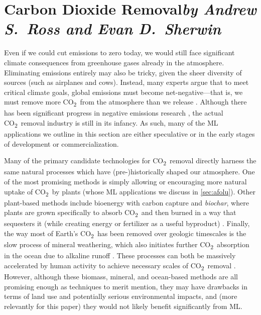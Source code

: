 \documentclass[11pt]{report}
\newcommand{\carbon}{\texorpdfstring{CO\textsubscript{2}}{CO2}}
\begin{document}
\section{Carbon Dioxide Removal\texorpdfstring{\hfill\textit{by Andrew S.~Ross and Evan D.~Sherwin}}{}}
\label{sec:ccs}
Even if we could cut emissions to zero today, we would still face significant climate consequences from greenhouse gases already in the atmosphere. 
Eliminating emissions entirely may also be tricky, given the sheer diversity of sources (such as airplanes and cows). Instead, many experts argue that to meet critical climate goals, global emissions must become net-negative---that is, we must remove more \carbon~from the atmosphere than we release \cite{fuss_betting_2014,gasser2015negative}. Although there has been significant progress in negative emissions research \cite{board2019negative,icef2018roadmap,minx2018negative,fuss2018negative,nemet2018negative}, the actual \carbon~removal industry is still in its infancy. As such, many of the ML applications we outline in this section are either speculative or in the early stages of development or commercialization.

Many of the primary candidate technologies for \carbon~removal directly harness the same natural processes which have (pre-)historically shaped our atmosphere.
One of the most promising methods is simply allowing or encouraging more natural uptake of \carbon~by plants (whose ML applications we discuss in \textsection\ref{sec:afolu}).
Other plant-based methods include bioenergy with carbon capture and \emph{biochar}, where plants are grown specifically to absorb \carbon~and then burned in a way that sequesters it (while creating energy or fertilizer as a useful byproduct) \cite{creutzig2015bioenergy,robledo2017bioenergy,board2019negative}. Finally, the way most of Earth's \carbon~has been removed over geologic timescales is the slow process of mineral weathering, which also initiates further \carbon~absorption in the ocean due to alkaline runoff \cite{schuiling2006enhanced}. These processes can both be massively accelerated by human activity to achieve necessary scales of \carbon~removal \cite{board2019negative}. However, although these biomass, mineral, and ocean-based methods are all promising enough as techniques to merit mention, they may have drawbacks in terms of land use and potentially serious environmental impacts, and (more relevantly for this paper) they would not likely benefit significantly from ML.
\end{document}
